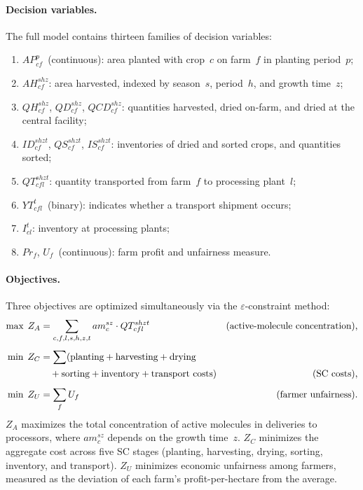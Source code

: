 \paragraph{Decision variables.}
The full model contains thirteen families of decision variables:
\begin{enumerate}
    \item $AP^{p}_{cf}$~(continuous): area planted with crop~$c$ on farm~$f$ in planting period~$p$;
    \item $AH^{shz}_{cf}$: area harvested, indexed by season~$s$, period~$h$, and growth time~$z$;
    \item $QH^{shz}_{cf}$, $QD^{shz}_{cf}$, $QCD^{shz}_{cf}$: quantities harvested, dried on-farm, and dried at the central facility;
    \item $ID^{shzt}_{cf}$, $QS^{shzt}_{cf}$, $IS^{shzt}_{cf}$: inventories of dried and sorted crops, and quantities sorted;
    \item $QT^{shzt}_{cfl}$: quantity transported from farm~$f$ to processing plant~$l$;
    \item $YT^{t}_{cfl}$~(binary): indicates whether a transport shipment occurs;
    \item $I^{t}_{cl}$: inventory at processing plants;
    \item $Pr_f$, $U_f$~(continuous): farm profit and unfairness measure.
\end{enumerate}

\paragraph{Objectives.}
Three objectives are optimized simultaneously via the $\varepsilon$-constraint method:
\begin{align}
    \max\; Z_A &= \sum_{c,f,l,s,h,z,t} am^{sz}_{c}\cdot QT^{shzt}_{cfl}
        & \text{(active-molecule concentration),} \label{eq:esteso_ZA}\\[4pt]
    \min\; Z_C &= \sum (\text{planting} + \text{harvesting} + \text{drying} \notag\\
               &\quad + \text{sorting} + \text{inventory} + \text{transport costs})
        & \text{(SC costs),} \label{eq:esteso_ZC}\\[4pt]
    \min\; Z_U &= \sum_f U_f
        & \text{(farmer unfairness).} \label{eq:esteso_ZU}
\end{align}
$Z_A$ maximizes the total concentration of active molecules in deliveries to processors, where $am^{sz}_c$ depends on the growth time~$z$. $Z_C$ minimizes the aggregate cost across five SC stages (planting, harvesting, drying, sorting, inventory, and transport). $Z_U$ minimizes economic unfairness among farmers, measured as the deviation of each farm's profit-per-hectare from the average.

